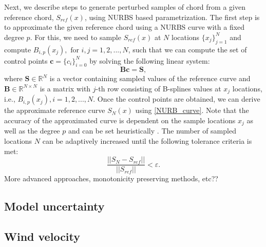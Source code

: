 \documentclass[review]{elsarticle}
\newtheorem{remark}{Remark}[section]
\numberwithin{equation}{section}
\numberwithin{equation}{section}
\begin{document}
Next, we describe steps to generate perturbed samples of chord from a given reference chord, $S_{ref}(x)$, using NURBS based parametrization. The first step is to approximate the given reference chord using a NURBS curve with a fixed degree $p$. For this, we need to sample $S_{ref}(x)$ at $N$ locations $\{x_j\}_{j=1}^N$ and compute $B_{i,p}(x_j), \text{ for }i, j = 1,2, ..., N$, such that we can compute the set of control points $\mathbf{c}=\{c_i\}_{i=0}^N$ by solving the following linear system:
\begin{equation}\label{nurbs_inversion}
\mathbf{B}\mathbf{c} = \mathbf{S},
\end{equation}
where $\mathbf{S}\in \mathbb{R}^{N}$ is a vector containing sampled values of the reference curve and $\mathbf{B}\in \mathbb{R}^{N\times N}$ is a matrix with $j$-th row consisting of B-splines values at $x_j$ locations, i.e., $B_{i,p}(x_j), i= 1, 2,..., N$. 
Once the control points are obtained, we can derive the approximate reference curve $S_N(x)$ using \eqref{NURB_curve}. Note that the accuracy of the approximated curve is dependent on the sample locations $x_j$ as well as the degree $p$ and can be set heuristically \cite{adaptiveNurbs}. The number of sampled locations $N$ can be adaptively increased until the following tolerance criteria is met:
\begin{equation}
\frac{||S_N - S_{ref}||}{||S_{ref}||} <\varepsilon.
\end{equation}
More advanced approaches, monotonicity preserving methods, etc??
%
\subsection{Model uncertainty}
\subsection{Wind velocity}
\end{document}
